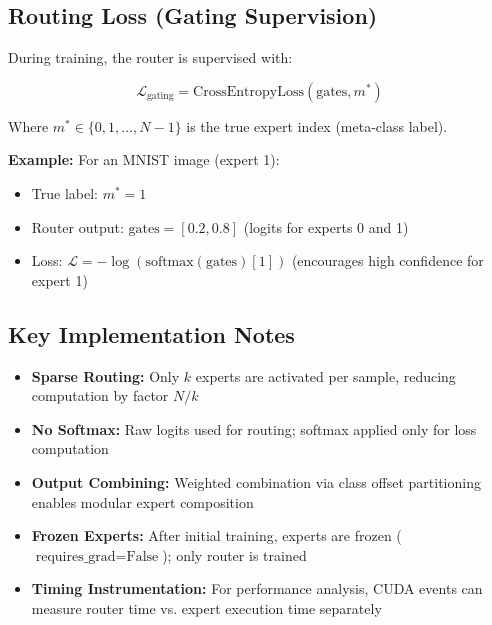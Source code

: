 \documentclass[11pt,a4paper]{article}
\begin{document}
\subsection{Routing Loss (Gating Supervision)}

During training, the router is supervised with:

\begin{equation}
    \mathcal{L}_{\text{gating}} = \text{CrossEntropyLoss}(\text{gates}, m^*)
\end{equation}

Where $m^* \in \{0, 1, \ldots, N-1\}$ is the true expert index (meta-class label).

\textbf{Example:} For an MNIST image (expert 1):
\begin{itemize}
    \item True label: $m^* = 1$
    \item Router output: $\text{gates} = [0.2, 0.8]$ (logits for experts 0 and 1)
    \item Loss: $\mathcal{L} = -\log(\text{softmax}(\text{gates})[1])$ (encourages high confidence for expert 1)
\end{itemize}

\subsection{Key Implementation Notes}

\begin{itemize}
    \item \textbf{Sparse Routing:} Only $k$ experts are activated per sample, reducing computation by factor $N/k$
    \item \textbf{No Softmax:} Raw logits used for routing; softmax applied only for loss computation
    \item \textbf{Output Combining:} Weighted combination via class offset partitioning enables modular expert composition
    \item \textbf{Frozen Experts:} After initial training, experts are frozen ($\text{requires\_grad} = \text{False}$); only router is trained
    \item \textbf{Timing Instrumentation:} For performance analysis, CUDA events can measure router time vs. expert execution time separately
\end{itemize}
\end{document}

